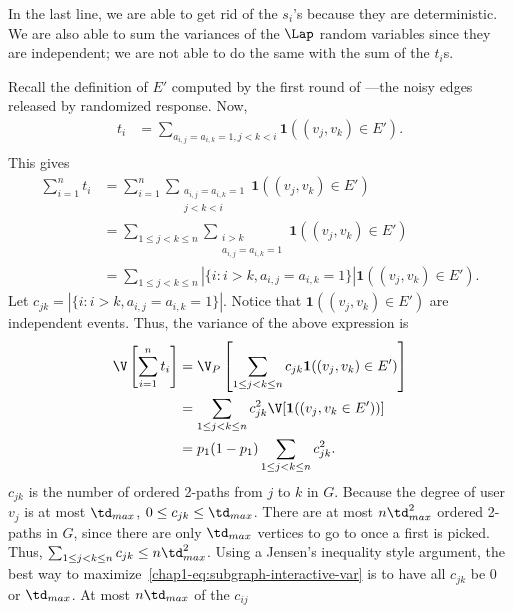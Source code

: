   In the last line, we are able to get rid of the $s_i$'s because they are
  deterministic. We are also able to sum the variances of the $\Lap$ random
  variables since they are independent; we are not able to do the same with the
  sum of the $t_i$s. 

  Recall the definition of $E'$ computed by the first round of
  ---the noisy edges released by randomized
  response. Now,
  \begin{align*}
    t_i &= \sum_{a_{i,j}=a_{i,k}=1, j<k<i} \textbf{1}((v_j,v_k) \in E'). \\
  \end{align*}
  This gives
  \begin{align*}
    \sum_{i=1}^n t_i &= \sum_{i=1}^n\sum_{\substack{a_{i,j}=a_{i,k}=1 \\ j<k<i }} \textbf{1}((v_j,v_k) \in
    E') \\
    &= \sum_{1 \leq j < k \leq n} \sum_{\substack{i > k \\ a_{i,j}=a_{i,k}=1
    }} \textbf{1}((v_j,v_k) \in E') \\
    &= \sum_{1 \leq j < k \leq n} |\{i : i>k, a_{i,j}=a_{i,k}=1\}| \textbf{1}((v_j,v_k)
    \in E').
  \end{align*}
  Let $c_{jk} = |\{i : i>k, a_{i,j}=a_{i,k}=1\}|$. Notice that $\textbf{1}( (v_j,v_k) \in E')$
  are independent events. Thus, the variance of the above expression is
  \begin{align}
    \V\left[\sum_{i=1}^n t_i\right] &= \V_P \left[\sum_{1 \leq j < k \leq n}
    c_{jk} \textbf{1}( (v_j,v_k) \in E') \right] \nonumber \\
    &= \sum_{1 \leq j < k \leq n} c_{jk}^2 \V[\textbf{1}( (v_j,v_k \in E')) ]
    \nonumber \\
    &= p_1 (1-p_1) \sum_{1 \leq j < k \leq n} c_{jk}^2.
    \label{chap1-eq:subgraph-interactive-var}
  \end{align}
  $c_{jk}$ is the number of ordered 2-paths from $j$ to $k$ in $G$. Because 
  the degree of user $v_j$ is at most $\td_{max}$, 
  $0 \leq c_{jk} \leq \td_{max}$. There are at most
  $n\td_{max}^2$ ordered
  2-paths in $G$, since there are only $\td_{max}$ vertices to go to once a first is
  picked. Thus, $\sum_{1 \leq j < k \leq n} c_{jk} \leq n\td_{max}^2$. Using a Jensen's inequality
  style argument, the best way to maximize~\eqref{chap1-eq:subgraph-interactive-var} is to have
  all $c_{jk}$ be $0$ or $\td_{max}$. At most $n\td_{max}$ of the $c_{ij}$

